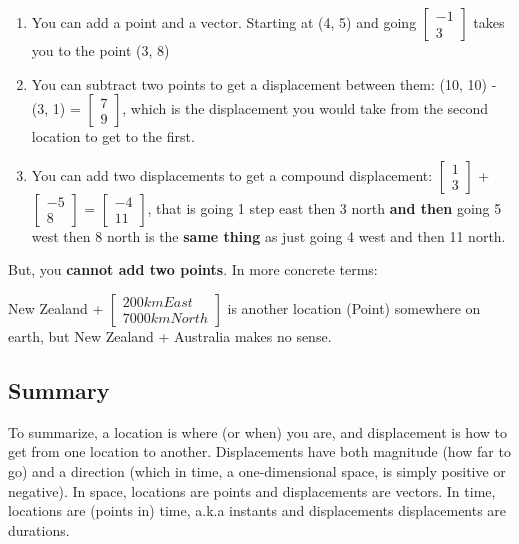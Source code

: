 \documentclass{article}
\begin{document}
\begin{enumerate}
    \item You can add a point and a vector. Starting at (4, 5) and going $\begin{bmatrix} -1 \\ 3 \end{bmatrix}$ takes you to the point (3, 8)
    \item You can subtract two points to get a displacement between them: (10, 10) - (3, 1) = $\begin{bmatrix} 7 \\ 9 \end{bmatrix}$, which is the displacement you would take from the second location to get to the first.
    \item You can add two displacements to get a compound displacement: $\begin{bmatrix} 1 \\ 3 \end{bmatrix}$ + $\begin{bmatrix} -5 \\ 8 \end{bmatrix}$ = $\begin{bmatrix} -4 \\ 11 \end{bmatrix}$, that is going 1 step east then 3 north \textbf{and then} going 5 west then 8 north is the \textbf{same thing} as just going 4 west and then 11 north.
\end{enumerate}

But, you \textbf{cannot add two points}. In more concrete terms:

New Zealand + $\begin{bmatrix} 200km East \\ 7000km North \end{bmatrix}$ is another location (Point) somewhere on earth, but New Zealand + Australia makes no sense.


\begin{center}
    \section{Summary}    
\end{center}

To summarize, a location is where (or when) you are, and displacement is how to get from one location to another. Displacements have both magnitude (how far to go) and a direction (which in time, a one-dimensional space, is simply positive or negative). In space, locations are points and displacements are vectors. In time, locations are (points in) time, a.k.a instants and displacements displacements are durations.
\end{document}
